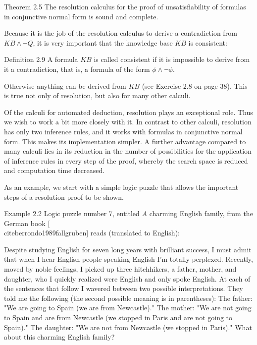 \documentclass[10pt]{book}
\begin{document}
\begin{displayquote}
Theorem 2.5 The resolution calculus for the proof of unsatisfiability of formulas in conjunctive normal form is sound and complete.
\end{displayquote}

Because it is the job of the resolution calculus to derive a contradiction from $K B \wedge \neg Q$, it is very important that the knowledge base $K B$ is consistent:

Definition 2.9 A formula $K B$ is called consistent if it is impossible to derive from it a contradiction, that is, a formula of the form $\phi \wedge \neg \phi$.

Otherwise anything can be derived from $K B$ (see Exercise 2.8 on page 38). This is true not only of resolution, but also for many other calculi.

Of the calculi for automated deduction, resolution plays an exceptional role. Thus we wish to work a bit more closely with it. In contrast to other calculi, resolution has only two inference rules, and it works with formulas in conjunctive normal form. This makes its implementation simpler. A further advantage compared to many calculi lies in its reduction in the number of possibilities for the application of inference rules in every step of the proof, whereby the search space is reduced and computation time decreased.

As an example, we start with a simple logic puzzle that allows the important steps of a resolution proof to be shown.

Example 2.2 Logic puzzle number 7, entitled $A$ charming English family, from the German book [\\cite{berrondo1989fallgruben}] reads (translated to English):


Despite studying English for seven long years with brilliant success, I must admit that when I hear English people speaking English I'm totally perplexed. Recently, moved by noble feelings, I picked up three hitchhikers, a father, mother, and daughter, who I quickly realized were English and only spoke English. At each of the sentences that follow I wavered between two possible interpretations. They told me the following (the second possible meaning is in parentheses): The father: "We are going to Spain (we are from Newcastle)." The mother: "We are not going to Spain and are from Newcastle (we stopped in Paris and are not going to Spain)." The daughter: "We are not from Newcastle (we stopped in Paris)." What about this charming English family?
\end{document}
